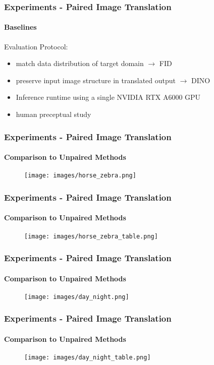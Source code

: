\documentclass[aspectratio=169, lecture, amberg]{OTHAWbeamer}
\begin{document}
\begin{frame}
    \frametitle{Experiments - Paired Image Translation}
    \framesubtitle{Baselines}
    Evaluation Protocol:
    \begin{itemize}
        \item match data distribution of target domain $\rightarrow$ FID \cite{heusel2018gans}
        \item preserve input image structure in translated output $\rightarrow$ DINO \cite{tumanyan2022splicing}
        \item Inference runtime using a single NVIDIA RTX A6000 GPU
        \item human preceptual study
    \end{itemize}
    
    
\end{frame}

\begin{frame}
    \frametitle{Experiments - Paired Image Translation}
    \framesubtitle{Comparison to Unpaired Methods}
    \begin{figure}
        \centering
        \texttt{[image: images/horse\_zebra.png]}
        
    \end{figure}
\end{frame}

\begin{frame}
    \frametitle{Experiments - Paired Image Translation}
    \framesubtitle{Comparison to Unpaired Methods}
    \begin{figure}
        \centering
        \texttt{[image: images/horse\_zebra\_table.png]}
        
    \end{figure}
\end{frame}

\begin{frame}
\frametitle{Experiments - Paired Image Translation}
\framesubtitle{Comparison to Unpaired Methods}
\begin{figure}
    \centering
    \texttt{[image: images/day\_night.png]}
    
\end{figure}
\end{frame}

\begin{frame}
    \frametitle{Experiments - Paired Image Translation}
    \framesubtitle{Comparison to Unpaired Methods}
    \begin{figure}
        \centering
        \texttt{[image: images/day\_night\_table.png]}
        
    \end{figure}
\end{frame}
\end{document}
